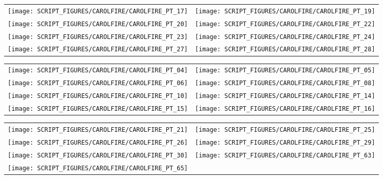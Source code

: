 \begin{figure}[p]
\begin{tabular*}{\textwidth}{l@{\extracolsep{\fill}}r}
\texttt{[image: SCRIPT\_FIGURES/CAROLFIRE/CAROLFIRE\_PT\_17]} &
\texttt{[image: SCRIPT\_FIGURES/CAROLFIRE/CAROLFIRE\_PT\_19]} \\
\texttt{[image: SCRIPT\_FIGURES/CAROLFIRE/CAROLFIRE\_PT\_20]} &
\texttt{[image: SCRIPT\_FIGURES/CAROLFIRE/CAROLFIRE\_PT\_22]} \\
\texttt{[image: SCRIPT\_FIGURES/CAROLFIRE/CAROLFIRE\_PT\_23]} &
\texttt{[image: SCRIPT\_FIGURES/CAROLFIRE/CAROLFIRE\_PT\_24]} \\
\texttt{[image: SCRIPT\_FIGURES/CAROLFIRE/CAROLFIRE\_PT\_27]} &
\texttt{[image: SCRIPT\_FIGURES/CAROLFIRE/CAROLFIRE\_PT\_28]}
\end{tabular*}
\label{CAROLFIRE_Thermoset_2}
\end{figure}

\begin{figure}[p]
\begin{tabular*}{\textwidth}{l@{\extracolsep{\fill}}r}
\texttt{[image: SCRIPT\_FIGURES/CAROLFIRE/CAROLFIRE\_PT\_04]} &
\texttt{[image: SCRIPT\_FIGURES/CAROLFIRE/CAROLFIRE\_PT\_05]} \\
\texttt{[image: SCRIPT\_FIGURES/CAROLFIRE/CAROLFIRE\_PT\_06]} &
\texttt{[image: SCRIPT\_FIGURES/CAROLFIRE/CAROLFIRE\_PT\_08]} \\
\texttt{[image: SCRIPT\_FIGURES/CAROLFIRE/CAROLFIRE\_PT\_10]} &
\texttt{[image: SCRIPT\_FIGURES/CAROLFIRE/CAROLFIRE\_PT\_14]} \\
\texttt{[image: SCRIPT\_FIGURES/CAROLFIRE/CAROLFIRE\_PT\_15]} &
\texttt{[image: SCRIPT\_FIGURES/CAROLFIRE/CAROLFIRE\_PT\_16]}
\end{tabular*}
\label{CAROLFIRE_Thermoplastic_1}
\end{figure}

\begin{figure}[p]
\begin{tabular*}{\textwidth}{l@{\extracolsep{\fill}}r}
\texttt{[image: SCRIPT\_FIGURES/CAROLFIRE/CAROLFIRE\_PT\_21]} &
\texttt{[image: SCRIPT\_FIGURES/CAROLFIRE/CAROLFIRE\_PT\_25]} \\
\texttt{[image: SCRIPT\_FIGURES/CAROLFIRE/CAROLFIRE\_PT\_26]} &
\texttt{[image: SCRIPT\_FIGURES/CAROLFIRE/CAROLFIRE\_PT\_29]} \\
\texttt{[image: SCRIPT\_FIGURES/CAROLFIRE/CAROLFIRE\_PT\_30]} &
\texttt{[image: SCRIPT\_FIGURES/CAROLFIRE/CAROLFIRE\_PT\_63]} \\
\texttt{[image: SCRIPT\_FIGURES/CAROLFIRE/CAROLFIRE\_PT\_65]}
\end{tabular*}
\label{CAROLFIRE_Thermoplastic_2}
\end{figure}

